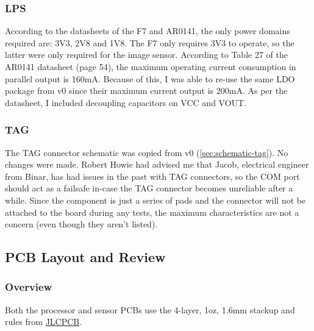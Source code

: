 \documentclass[10pt]{article}
\newcommand{\nl}{\newline \newline}
\begin{document}
\subsubsection{LPS}
According to the datasheets of the F7 and AR0141, the only power domains required are: 3V3, 2V8 and 1V8. The F7 only requires 3V3 to operate, so the latter were only required for the image sensor.
According to Table 27 of the AR0141 datasheet (page 54), the maximum operating current consumption in parallel output is 160mA. Because of this, I was able to re-use the same LDO package from v0 since their maximum current output is 200mA.
As per the datasheet, I included decoupling capacitors on VCC and VOUT.

\subsubsection{TAG}
The TAG connector schematic was copied from v0 (\autoref{sec:schematic-tag}). No changes were made. Robert Howie had advised me that Jacob, electrical engineer from Binar, has had issues in the past with TAG connectors, so the COM port should act as a failsafe in-case the TAG connector becomes unreliable after a while.
\nl
Since the component is just a series of pads and the connector will not be attached to the board during any tests, the maximum characteristics are not a concern (even though they aren't listed).

\subsection{PCB Layout and Review}

\subsubsection{Overview}
Both the processor and sensor PCBs use the 4-layer, 1oz, 1.6mm stackup and rules from \href{https://github.com/ayberkozgur/jlcpcb-design-rules-stackups}{JLCPCB}.
\end{document}
